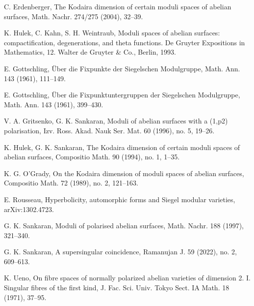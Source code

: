 \documentclass[12pt, pdftex]{amsart}
\theoremstyle{plain}
\theoremstyle{definition}
\numberwithin{equation}{section}
\begin{document}
\begin{thebibliography}{99}

C. Erdenberger,
The Kodaira dimension of certain moduli spaces of abelian surfaces,
Math. Nachr. 274/275 (2004), 32–39.

K. Hulek, C. Kahn, S. H. Weintraub, 
Moduli spaces of abelian surfaces: compactification, degenerations, and theta functions.
De Gruyter Expositions in Mathematics, 12. Walter de Gruyter \& Co., Berlin, 1993.

E. Gottschling,
Über die Fixpunkte der Siegelschen Modulgruppe,
Math. Ann. 143 (1961), 111–149.

E. Gottschling,
Über die Fixpunktuntergruppen der Siegelschen Modulgruppe,
Math. Ann. 143 (1961), 399–430.

V. A. Gritsenko, G. K. Sankaran, 
Moduli of abelian surfaces with a (1,p2) polarisation,
Izv. Ross. Akad. Nauk Ser. Mat. 60 (1996), no. 5, 19–26.

K. Hulek, G. K. Sankaran,
The Kodaira dimension of certain moduli spaces of abelian surfaces,
Compositio Math. 90 (1994), no. 1, 1–35.

K. G. O'Grady,
On the Kodaira dimension of moduli spaces of abelian surfaces,
Compositio Math. 72 (1989), no. 2, 121–163.

E. Rousseau,
Hyperbolicity, automorphic forms and Siegel modular varieties,
arXiv:1302.4723.

G. K. Sankaran, 
Moduli of polarised abelian surfaces,
Math. Nachr. 188 (1997), 321–340.

G. K. Sankaran,
A supersingular coincidence,
Ramanujan J. 59 (2022), no. 2, 609–613.

K. Ueno, 
On fibre spaces of normally polarized abelian varieties of dimension 2. I. Singular fibres of the first kind,
J. Fac. Sci. Univ. Tokyo Sect. IA Math. 18 (1971), 37–95.

\end{thebibliography}
\end{document}
